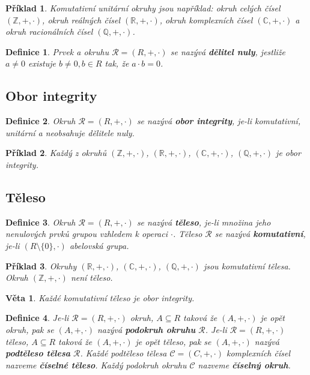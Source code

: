 \documentclass[12pt,a4paper]{article}
\newtheorem{definition}{Definice}
\newtheorem{sentence}{Věta}
\newtheorem{example}{Příklad}
\begin{document}
\begin{example}
	Komutativní unitární okruhy jsou například: okruh celých čísel $(\mathbb{Z}, + , \cdot)$, okruh reálných čísel $(\mathbb{R}, + , \cdot)$, okruh komplexních čísel $(\mathbb{C}, + , \cdot)$ a okruh racionálních čísel $(\mathbb{Q}, + , \cdot)$.
\end{example}

\begin{definition}
	Prvek a okruhu $\mathscr{R} = (R,+,\cdot)$ se nazývá \textbf{dělitel nuly}, jestliže $a \not= 0$ existuje $b \not= 0, b \in R$ tak, že $a \cdot b = 0$.
\end{definition}

\subsection{Obor integrity}
\begin{definition}
	Okruh $\mathscr{R} = (R,+,\cdot)$ se nazývá \textbf{obor integrity}, je-li komutativní, unitární a neobsahuje dělitele nuly.
\end{definition}

\begin{example}
	Každý z okruhů $(\mathbb{Z}, + , \cdot)$, $(\mathbb{R}, + , \cdot)$,  $(\mathbb{C}, + , \cdot)$, $(\mathbb{Q}, + , \cdot)$ je obor integrity.
\end{example}


\subsection{Těleso}
\begin{definition}
	Okruh $\mathscr{R} = (R,+,\cdot)$ se nazývá \textbf{těleso}, je-li množina jeho nenulových prvků grupou vzhledem k operaci $\cdot$. Těleso $\mathscr{R}$ se nazývá \textbf{komutativní}, je-li $(R \setminus \{0\}, \cdot)$ abelovská grupa.
\end{definition}

\begin{example}
	Okruhy  $(\mathbb{R}, + , \cdot)$,  $(\mathbb{C}, + , \cdot)$, $(\mathbb{Q}, + , \cdot)$ jsou komutativní tělesa. Okruh $(\mathbb{Z}, + , \cdot)$ není těleso.
\end{example}

\begin{sentence}
	Každé komutativní těleso je obor integrity.
\end{sentence}

\begin{definition}
	Je-li  $\mathscr{R} = (R,+,\cdot)$ okruh, $A \subseteq R$ taková že  $(A,+,\cdot)$ je opět okruh, pak se    $(A,+,\cdot)$ nazývá \textbf{podokruh okruhu} $\mathscr{R}$. Je-li  $\mathscr{R} = (R,+,\cdot)$ těleso, $A \subseteq R$ taková že  $(A,+,\cdot)$ je opět těleso, pak se $(A,+,\cdot)$ nazývá \textbf{podtěleso tělesa} $\mathscr{R}$. Každé podtěleso tělesa $\mathscr{C} = (C,+,\cdot)$  komplexních čísel nazveme \textbf{číselné těleso}. Každý podokruh okruhu  $\mathscr{C}$ nazveme \textbf{číselný okruh}.
\end{definition}
\end{document}
